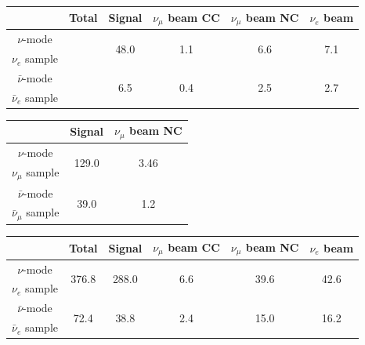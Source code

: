 \documentclass[a4 paper,12pt]{report}%
\begin{document}
\begin{center}
\label{tab:novanue_1}
\begin{tabular}{|c| c| c| c| c| c| }
\hline
&  Total & Signal & $\nu_\mu$ beam CC   & $\nu_\mu$ beam NC  & $\nu_e$ beam \\ 
 \hline  
 $\nu$-mode &  \multirow{2}{*}{} & \multirow{2}{*}{48.0} & \multirow{2}{*}{1.1} & \multirow{2}{*}{6.6} & \multirow{2}{*}{7.1} \\
 $\nu_e$ sample & &&& &\\ 
\hline 
$\bar{\nu}$-mode &  \multirow{2}{*}{} &\multirow{2}{*}{6.5} & \multirow{2}{*}{0.4} & \multirow{2}{*}{2.5}  & \multirow{2}{*}{2.7}  \\
 $\bar{\nu}_e$ sample & &&& &\\ 
\hline 
\end{tabular} 
\end{center}

\begin{center}
\label{tab:novanumu_1}
\begin{tabular}{|c| c| c| }
\hline
 & Signal & $\nu_\mu$ beam NC  \\ 
 \hline  
 $\nu$-mode &  \multirow{2}{*}{129.0} & \multirow{2}{*}{3.46}  \\
 $\nu_\mu$ sample &&\\ 
\hline 
$\bar{\nu}$-mode &  \multirow{2}{*}{39.0} &\multirow{2}{*}{1.2}  \\
 $\bar{\nu}_\mu$ sample & &\\ 
\hline 
\end{tabular} 
\end{center}






\begin{center}
\label{tab:novanue}
\begin{tabular}{|c| c| c| c| c| c| }
\hline
&  Total & Signal & $\nu_\mu$ beam CC   & $\nu_\mu$ beam NC  & $\nu_e$ beam \\ 
 \hline  
 $\nu$-mode &  \multirow{2}{*}{376.8} & \multirow{2}{*}{288.0} & \multirow{2}{*}{6.6} & \multirow{2}{*}{39.6} & \multirow{2}{*}{42.6} \\
 $\nu_e$ sample & &&& &\\ 
\hline 
$\bar{\nu}$-mode &  \multirow{2}{*}{72.4} &\multirow{2}{*}{38.8} & \multirow{2}{*}{2.4} & \multirow{2}{*}{15.0}  & \multirow{2}{*}{16.2}  \\
 $\bar{\nu}_e$ sample & &&& &\\ 
\hline 
\end{tabular} 
\end{center}
\end{document}
